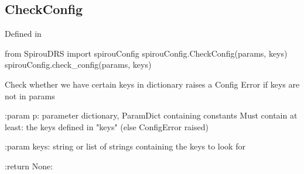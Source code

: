 \noindent\begin{minipage}{\textwidth}
\subsection{CheckConfig}

Defined in \spirouConfig{}

\begin{pythonbox}
from SpirouDRS import spirouConfig
spirouConfig.CheckConfig(params, keys)
spirouConfig.check_config(params, keys)
\end{pythonbox}

\begin{pythondocstring}
Check whether we have certain keys in dictionary
raises a Config Error if keys are not in params

:param p: parameter dictionary, ParamDict containing constants
    Must contain at least:
        the keys defined in "keys" (else ConfigError raised)

:param keys: string or list of strings containing the keys to look for

:return None:
\end{pythondocstring}
\end{minipage}

